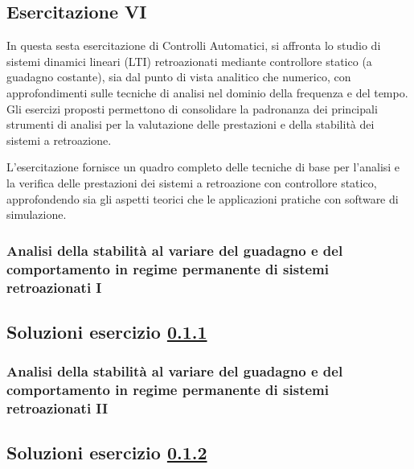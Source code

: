 \documentclass[../main.tex]{subfiles}
\begin{document}
\clearpage
\thispagestyle{empty}
\subsection{Esercitazione VI}

In questa sesta esercitazione di Controlli Automatici, si affronta lo studio di sistemi dinamici lineari (LTI) retroazionati mediante controllore statico (a guadagno costante), sia dal punto di vista analitico che numerico, con approfondimenti sulle tecniche di analisi nel dominio della frequenza e del tempo. Gli esercizi proposti permettono di consolidare la padronanza dei principali strumenti di analisi per la valutazione delle prestazioni e della stabilità dei sistemi a retroazione.

L’esercitazione fornisce un quadro completo delle tecniche di base per l’analisi e la verifica delle prestazioni dei sistemi a retroazione con controllore statico, approfondendo sia gli aspetti teorici che le applicazioni pratiche con software di simulazione.

\vspace*{1cm}
\subsubsection{Analisi della stabilità al variare del guadagno e del comportamento in regime permanente di sistemi retroazionati I}
\label{lab61}

\subsection*{Soluzioni esercizio \ref{lab61}}


\vspace*{1cm}
\subsubsection{Analisi della stabilità al variare del guadagno e del comportamento in regime permanente di sistemi retroazionati II}
\label{lab62}

\subsection*{Soluzioni esercizio \ref{lab62}}
\end{document}
